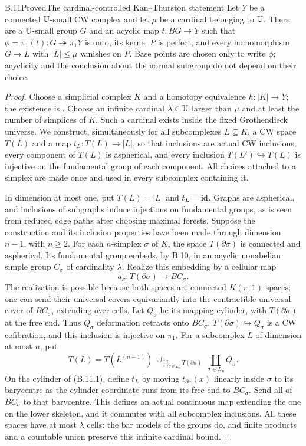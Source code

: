 \begin{claim}{B.11}{Proved}{The cardinal-controlled Kan--Thurston statement}
Let $Y$ be a connected $\mathbb U$-small CW complex and let $\mu$ be
a cardinal belonging to $\mathbb U$. There are a $\mathbb U$-small group $G$
and an acyclic map $t:BG\to Y$ such that
$\phi=\pi_1(t):G\twoheadrightarrow\pi_1Y$ is onto, its kernel
$P$ is perfect, and every homomorphism $G\to L$ with
$|L|\leq\mu$ vanishes on $P$. Base points are chosen only to
write $\phi$; acyclicity and the conclusion about the normal
subgroup do not depend on their choice.
\end{claim}
\begin{proof}
Choose a simplicial complex $K$ and a homotopy equivalence
$h:|K|\to Y$; the existence is
\citet[Theorem~2C.5]{C_Hatcher2002}. Choose an infinite
cardinal $\lambda\in\mathbb U$ larger than $\mu$ and at least the
number of simplices of $K$. Such a cardinal exists inside the
fixed Grothendieck universe. We construct, simultaneously for
all subcomplexes $L\subseteq K$, a CW space $T(L)$ and a map
$t_L:T(L)\to|L|$, so that inclusions are actual CW inclusions,
every component of $T(L)$ is aspherical, and every inclusion
$T(L')\hookrightarrow T(L)$ is injective on the fundamental
group of each component. All choices attached to a simplex
are made once and used in every subcomplex containing it.

In dimension at most one, put $T(L)=|L|$ and $t_L=\mathrm{id}$.
Graphs are aspherical, and inclusions of subgraphs induce
injections on fundamental groups, as is seen from reduced
edge paths after choosing maximal forests. Suppose the
construction and its inclusion properties have been made
through dimension $n-1$, with $n\geq2$. For each $n$-simplex
$\sigma$ of $K$, the space $T(\partial\sigma)$ is connected
and aspherical. Its fundamental group embeds, by B.10, in
an acyclic nonabelian simple group $C_\sigma$ of cardinality
$\lambda$. Realize this embedding by a cellular map
\[
 a_\sigma:T(\partial\sigma)\longrightarrow BC_\sigma.
 \tag{B.11.1}
\]
The realization is possible because both spaces are connected
$K(\pi,1)$ spaces; one can send their universal covers
equivariantly into the contractible universal cover of
$BC_\sigma$, extending over cells. Let $Q_\sigma$ be its
mapping cylinder, with $T(\partial\sigma)$ at the free end.
Thus $Q_\sigma$ deformation retracts onto $BC_\sigma$,
$T(\partial\sigma)\hookrightarrow Q_\sigma$ is a CW
cofibration, and this inclusion is injective on $\pi_1$.
For a subcomplex $L$ of dimension at most $n$, put
\[
 T(L)=T(L^{(n-1)})\ \cup_{\coprod_{\sigma\in L_n}
                  T(\partial\sigma)}\
                  \coprod_{\sigma\in L_n}Q_\sigma .
 \tag{B.11.2}
\]
On the cylinder of (B.11.1), define $t_L$ by moving
$t_{\partial\sigma}(x)$ linearly inside $\sigma$ to its
barycentre as the cylinder coordinate runs from its free end
to $BC_\sigma$. Send all of $BC_\sigma$ to that barycentre.
This defines an actual continuous map extending the one on
the lower skeleton, and it commutes with all subcomplex
inclusions. All these spaces have at most $\lambda$ cells:
the bar models of the groups do, and finite products and a
countable union preserve this infinite cardinal bound.


\end{proof}
